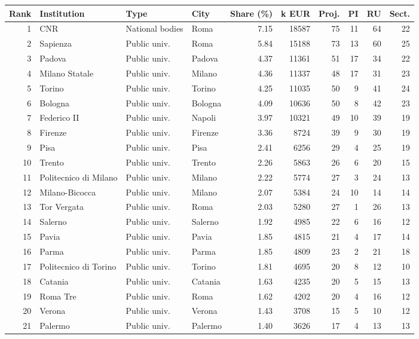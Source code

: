 \documentclass[11pt,a4paper]{article}
\begin{document}
{\footnotesize\setlength{\tabcolsep}{2.5pt}
\begin{longtable}{rlllrrrrrr}
\toprule
Rank & Institution & Type & City & Share (\%) & k EUR & Proj. & PI & RU & Sect. \\
\midrule
\endhead
1 & CNR & National bodies & Roma & 7.15 & 18587 & 75 & 11 & 64 & 22 \\
2 & Sapienza & Public univ. & Roma & 5.84 & 15188 & 73 & 13 & 60 & 25 \\
3 & Padova & Public univ. & Padova & 4.37 & 11361 & 51 & 17 & 34 & 22 \\
4 & Milano Statale & Public univ. & Milano & 4.36 & 11337 & 48 & 17 & 31 & 23 \\
5 & Torino & Public univ. & Torino & 4.25 & 11035 & 50 & 9 & 41 & 24 \\
6 & Bologna & Public univ. & Bologna & 4.09 & 10636 & 50 & 8 & 42 & 23 \\
7 & Federico II & Public univ. & Napoli & 3.97 & 10321 & 49 & 10 & 39 & 19 \\
8 & Firenze & Public univ. & Firenze & 3.36 & 8724 & 39 & 9 & 30 & 19 \\
9 & Pisa & Public univ. & Pisa & 2.41 & 6256 & 29 & 4 & 25 & 19 \\
10 & Trento & Public univ. & Trento & 2.26 & 5863 & 26 & 6 & 20 & 15 \\
11 & Politecnico di Milano & Public univ. & Milano & 2.22 & 5774 & 27 & 3 & 24 & 13 \\
12 & Milano-Bicocca & Public univ. & Milano & 2.07 & 5384 & 24 & 10 & 14 & 14 \\
13 & Tor Vergata & Public univ. & Roma & 2.03 & 5280 & 27 & 1 & 26 & 13 \\
14 & Salerno & Public univ. & Salerno & 1.92 & 4985 & 22 & 6 & 16 & 12 \\
15 & Pavia & Public univ. & Pavia & 1.85 & 4815 & 21 & 4 & 17 & 14 \\
16 & Parma & Public univ. & Parma & 1.85 & 4809 & 23 & 2 & 21 & 18 \\
17 & Politecnico di Torino & Public univ. & Torino & 1.81 & 4695 & 20 & 8 & 12 & 10 \\
18 & Catania & Public univ. & Catania & 1.63 & 4235 & 20 & 5 & 15 & 13 \\
19 & Roma Tre & Public univ. & Roma & 1.62 & 4202 & 20 & 4 & 16 & 12 \\
20 & Verona & Public univ. & Verona & 1.43 & 3708 & 15 & 5 & 10 & 12 \\
21 & Palermo & Public univ. & Palermo & 1.40 & 3626 & 17 & 4 & 13 & 13 \\

\end{longtable}}
\end{document}
